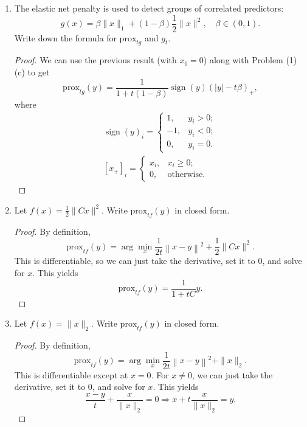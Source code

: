 \documentclass[11pt]{amsart}
\newcommand{\prox}{\mathrm{prox}}
\begin{document}
\begin{enumerate}
\begin{enumerate}
\item The elastic net penalty is used to detect groups of correlated predictors:
\[
g(x) = \beta \|x\|_1 + (1-\beta) \frac{1}{2}\|x\|^2, \quad \beta \in (0,1).
\] 
Write down the formula for $\prox_{t g}$ and $g_t$.

\begin{proof}
  We can use the previous result (with $x_0 = 0$) along with Problem (1)(c) to get
  \begin{equation*}
    \prox_{t g}(y) = \frac{1}{1 + t(1 - \beta)}\operatorname{sign}(y)\left(|y| - t\beta\right)_+,
  \end{equation*}
  where
  \begin{align*}
    \operatorname{sign}(y)_i = \begin{cases}
      1, &y_i > 0; \\
      -1, &y_i < 0; \\
      0, &y_i = 0.
    \end{cases} \\
    \left[x_+\right]_i = \begin{cases}
      x_i, &x_i \geq 0; \\
      0, &\text{otherwise}.
    \end{cases}
  \end{align*}
\end{proof}

\item Let $f(x) = \frac{1}{2}\|Cx\|^2$. Write $\prox_{t f}(y)$ in closed form.

  \begin{proof}
    By definition,
    \[      
      \prox_{t f}(y) = \arg\min_{x} \frac{1}{2t}\left\|x -  y\right\|^2 + \frac{1}{2}\|Cx\|^2.
    \]
    This is differentiable, so we can just take the derivative, set it to $0$,
    and solve for $x$. This yields
    \begin{equation*}
      \prox_{t f}(y) = \frac{1}{1 + tC}y.
    \end{equation*}
  \end{proof}
  
\item Let $f(x) = \|x\|_2$. Write $\prox_{tf}(y)$ in closed form.

    \begin{proof}
    By definition,
    \[      
      \prox_{t f}(y) = \arg\min_{x} \frac{1}{2t}\left\|x -  y\right\|^2 + \|x\|_2.
    \]
    This is differentiable except at $x = 0$. For $x \neq 0$, we can just take
    the derivative, set it to $0$, and solve for $x$. This yields
    \begin{equation*}
      \frac{x - y}{t} + \frac{x}{\|x\|_2} = 0 \Rightarrow x + t \frac{x}{\|x\|_2} = y.
    \end{equation*}


\end{proof}
\end{enumerate}
\end{enumerate}
\end{document}
